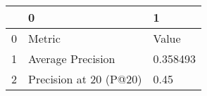 \begin{tabular}{lll}
\toprule
{} &                       0 &         1 \\
\midrule
0 &                  Metric &     Value \\
1 &       Average Precision &  0.358493 \\
2 &  Precision at 20 (P@20) &      0.45 \\
\bottomrule
\end{tabular}
